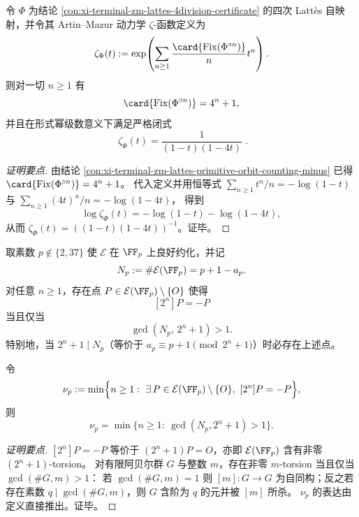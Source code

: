 \begin{conclusion}\label{con:xi-terminal-zm-lattes-artin-mazur-zeta}
令 \(\Phi\) 为结论 \ref{con:xi-terminal-zm-lattes-4division-certificate} 的四次 Latt\`es 自映射，并令其 Artin--Mazur 动力学 \(\zeta\)-函数定义为
\[
\zeta_{\Phi}(t):=\exp\!\left(\sum_{n\ge 1}\frac{\card{\mathrm{Fix}(\Phi^{\circ n})}}{n}t^{n}\right).
\]
则对一切 \(n\ge 1\) 有
\[
\card{\mathrm{Fix}(\Phi^{\circ n})}=4^{n}+1,
\]
并且在形式幂级数意义下满足严格闭式
\[
\boxed{\;\zeta_{\Phi}(t)=\frac{1}{(1-t)(1-4t)}\; }.
\]
\end{conclusion}
\begin{proof}[证明要点]
由结论 \ref{con:xi-terminal-zm-lattes-primitive-orbit-counting-minus} 已得 \(\card{\mathrm{Fix}(\Phi^{\circ n})}=4^{n}+1\)。
代入定义并用恒等式
\(
\sum_{n\ge 1}t^{n}/n=-\log(1-t)
\)
与
\(
\sum_{n\ge 1}(4t)^{n}/n=-\log(1-4t)
\)，
得到
\[
\log\zeta_{\Phi}(t)=-\log(1-t)-\log(1-4t),
\]
从而 \(\zeta_{\Phi}(t)=((1-t)(1-4t))^{-1}\)。证毕。
\end{proof}

\begin{conclusion}\label{con:xi-terminal-zm-lattes-minus-holonomy-modp-gcd}
取素数 \(p\notin\{2,37\}\) 使 \(\mathcal{E}\) 在 \(\FF_p\) 上良好约化，并记
\[
N_p:=\#\mathcal{E}(\FF_p)=p+1-a_p.
\]
对任意 \(n\ge 1\)，存在点 \(P\in\mathcal{E}(\FF_p)\setminus\{O\}\) 使得
\[
[2^{n}]P=-P
\]
当且仅当
\[
\gcd(N_p,\,2^{n}+1)>1.
\]
特别地，当 \(2^{n}+1\mid N_p\)（等价于 \(a_p\equiv p+1\pmod{2^{n}+1}\)）时必存在上述点。
\par
令
\[
\nu_p:=\min\Bigl\{n\ge 1:\ \exists\,P\in\mathcal{E}(\FF_p)\setminus\{O\},\ [2^{n}]P=-P\Bigr\},
\]
则
\[
\nu_p=\min\bigl\{n\ge 1:\ \gcd(N_p,2^{n}+1)>1\bigr\}.
\]
\end{conclusion}
\begin{proof}[证明要点]
\([2^{n}]P=-P\) 等价于 \((2^{n}+1)P=O\)，亦即 \(\mathcal{E}(\FF_p)\) 含有非零 \((2^{n}+1)\)-torsion。
对有限阿贝尔群 \(G\) 与整数 \(m\)，存在非零 \(m\)-torsion 当且仅当 \(\gcd(\#G,m)>1\)：
若 \(\gcd(\#G,m)=1\) 则 \([m]:G\to G\) 为自同构；反之若存在素数 \(q\mid\gcd(\#G,m)\)，则 \(G\) 含阶为 \(q\) 的元并被 \([m]\) 所杀。
\(\nu_p\) 的表达由定义直接推出。证毕。
\end{proof}

